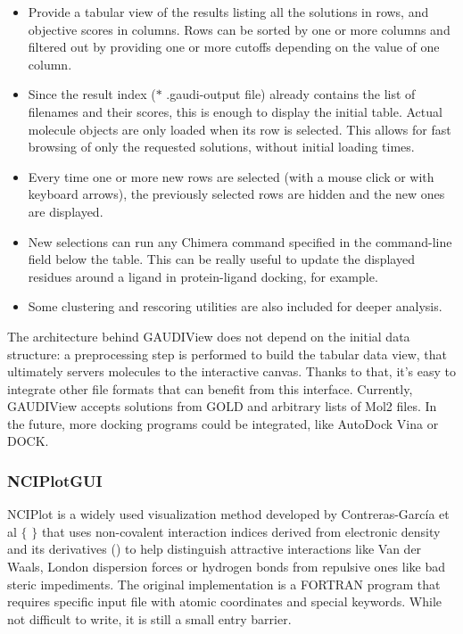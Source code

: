 \begin{itemize}
	\item Provide a tabular view of the results listing all the solutions in rows, and objective scores in columns. Rows can be sorted by one or more columns and filtered out by providing one or more cutoffs depending on the value of one column.

	\item Since the result index ($\ast$ .gaudi-output file) already contains the list of filenames and their scores, this is enough to display the initial table. Actual molecule objects are only loaded when its row is selected. This allows for fast browsing of only the requested solutions, without initial loading times.

	\item Every time one or more new rows are selected (with a mouse click or with keyboard arrows), the previously selected rows are hidden and the new ones are displayed.

	\item New selections can run any Chimera command specified in the command-line field below the table. This can be really useful to update the displayed residues around a ligand in protein-ligand docking, for example.

	\item Some clustering and rescoring utilities are also included for deeper analysis.
\end{itemize}

The architecture behind GAUDIView does not depend on the initial data structure: a preprocessing step is performed to build the tabular data view, that ultimately servers molecules to the interactive canvas. Thanks to that, it’s easy to integrate other file formats that can benefit from this interface. Currently, GAUDIView accepts solutions from GOLD and arbitrary lists of Mol2 files. In the future, more docking programs could be integrated, like AutoDock Vina or DOCK.

\subsubsection{NCIPlotGUI}
NCIPlot is a widely used visualization method developed by Contreras-García et al $ \{ $ $ \} $  that uses non-covalent interaction indices derived from electronic density and its derivatives () to help distinguish attractive interactions like Van der Waals, London dispersion forces or hydrogen bonds from repulsive ones like bad steric impediments. The original implementation is a FORTRAN program that requires specific input file with atomic coordinates and special keywords. While not difficult to write, it is still a small entry barrier.

